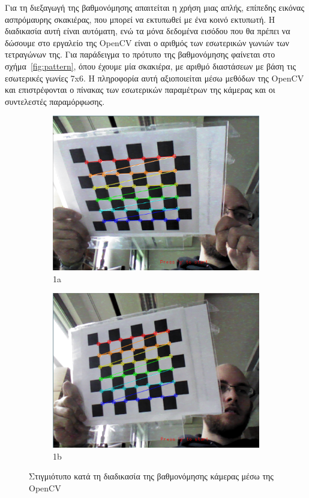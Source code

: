 Για τη διεξαγωγή της βαθμονόμησης απαιτείται η χρήση μιας απλής, επίπεδης εικόνας ασπρόμαυρης σκακιέρας, που μπορεί να εκτυπωθεί με ένα κοινό εκτυπωτή. Η διαδικασία αυτή είναι αυτόματη, ενώ τα μόνα δεδομένα εισόδου που θα πρέπει να δώσουμε στο εργαλείο της OpenCV είναι ο αριθμός των εσωτερικών γωνιών των τετραγώνων της. Για παράδειγμα το πρότυπο της βαθμονόμησης φαίνεται στο σχήμα~\ref{fig:pattern}, όπου έχουμε μία σκακιέρα, με αριθμό διαστάσεων με βάση τις εσωτερικές γωνίες 7x6. Η πληροφορία αυτή αξιοποιείται μέσω μεθόδων της OpenCV και επιστρέφονται ο πίνακας των εσωτερικών παραμέτρων της κάμερας και οι συντελεστές παραμόρφωσης. 


\begin{figure}[H]
\begin{subfigure}{.5\textwidth}
  \centering
  \includegraphics[width=.8\linewidth]{Files/Figures/calibration.png}
  \caption{1a}
  \label{fig:calibration_screenshot1}
\end{subfigure}%
\begin{subfigure}{.5\textwidth}
  \centering
  \includegraphics[width=.8\linewidth]{Files/Figures/calib2.png}
  \caption{1b}
  \label{fig:calibration_screenshot2}
\end{subfigure}
\caption[Στιγμιότυπο κατά τη διαδικασία της βαθμονόμησης κάμερας μέσω της OpenCV]{Στιγμιότυπο κατά τη διαδικασία της βαθμονόμησης κάμερας μέσω της OpenCV}
\label{fig:calibration_screenshot}
\end{figure}



